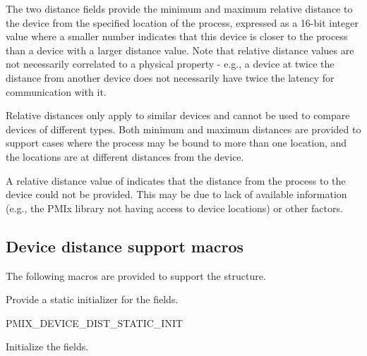 The two distance fields provide the minimum and maximum relative distance to the device from the specified location of the process, expressed as a 16-bit integer value where a smaller number indicates that this device is closer to the process than a device with a larger distance value. Note that relative distance values are not necessarily correlated to a physical property - e.g., a device at twice the distance from another device does not necessarily have twice the latency for communication with it.

Relative distances only apply to similar devices and cannot be used to compare devices of different types. Both minimum and maximum distances are provided to support cases where the process may be bound to more than one location, and the locations are at different distances from the device.

A relative distance value of  indicates that the distance from the process to the device could not be provided. This may be due to lack of available information (e.g., the \ac{PMIx} library not having access to device locations) or other factors.


\subsection{Device distance support macros}
\label{api:netenddist:macros}

The following macros are provided to support the  structure.


Provide a static initializer for the  fields.

\cspecificstart
\begin{codepar}
PMIX_DEVICE_DIST_STATIC_INIT
\end{codepar}
\cspecificend



Initialize the  fields.


\begin{arglist}
\end{arglist}

